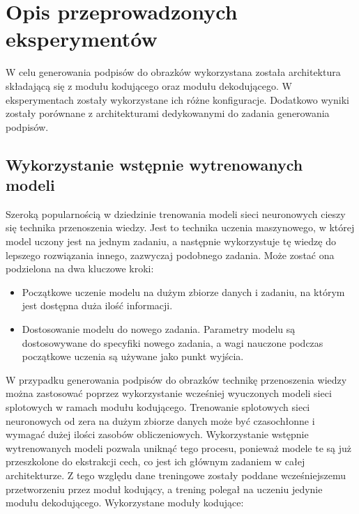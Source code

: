 \newpage %

\section{Opis przeprowadzonych eksperymentów}
W celu generowania podpisów do obrazków wykorzystana została architektura składającą się z modułu kodującego oraz modułu dekodującego. W eksperymentach zostały wykorzystane ich różne konfiguracje. Dodatkowo wyniki zostały porównane z architekturami dedykowanymi do zadania generowania podpisów.
\subsection{Wykorzystanie wstępnie wytrenowanych modeli}
Szeroką popularnością w dziedzinie trenowania modeli sieci neuronowych cieszy się technika przenoszenia wiedzy. Jest to technika uczenia maszynowego, w której model uczony jest na jednym zadaniu, a następnie wykorzystuje tę wiedzę do lepszego rozwiązania innego, zazwyczaj podobnego zadania. Może zostać ona podzielona na dwa kluczowe kroki:
\begin{itemize}
    \item Początkowe uczenie modelu na dużym zbiorze danych i zadaniu, na którym jest dostępna duża ilość informacji.
    \item  Dostosowanie modelu do nowego zadania. Parametry modelu są dostosowywane do specyfiki nowego zadania, a wagi nauczone podczas początkowe uczenia są używane jako punkt wyjścia.
\end{itemize}
W przypadku generowania podpisów do obrazków technikę przenoszenia wiedzy można zastosować poprzez wykorzystanie wcześniej wyuczonych modeli sieci splotowych w ramach modułu kodującego. Trenowanie splotowych sieci neuronowych od zera na dużym zbiorze danych może być czasochłonne i wymagać dużej ilości zasobów obliczeniowych. Wykorzystanie wstępnie wytrenowanych modeli pozwala uniknąć tego procesu, ponieważ modele te są już przeszkolone do ekstrakcji cech, co jest ich głównym zadaniem w całej architekturze. Z tego względu dane treningowe zostały poddane wcześniejszemu przetworzeniu przez moduł kodujący, a trening polegał na uczeniu jedynie modułu dekodującego. Wykorzystane moduły kodujące:
